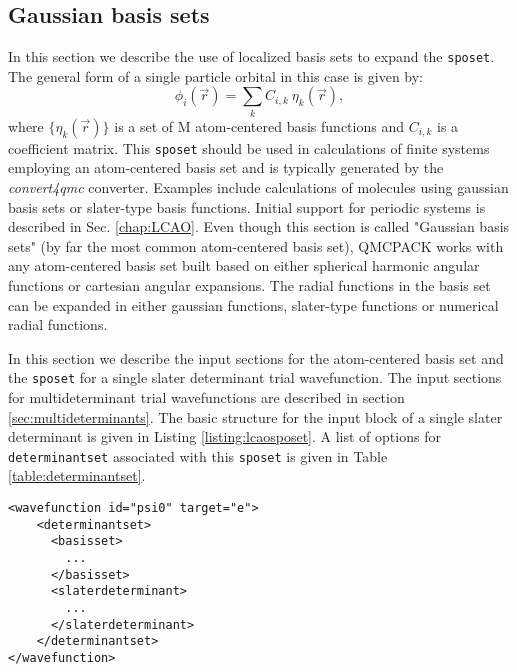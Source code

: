 \subsection{Gaussian basis sets}
\label{sec:gaussianbasis}

In this section we describe the use of localized basis sets to expand the \texttt{sposet}. The general form of a single particle orbital in this case is given by:
\begin{equation}
\phi_i(\vec{r}) = \sum_k C_{i,k} \ \eta_k(\vec{r}),
\end{equation}
where $\{\eta_k(\vec{r})\}$ is a set of M atom-centered basis
functions and $C_{i,k}$ is a coefficient matrix. This \texttt{sposet}
should be used in calculations of finite systems employing an
atom-centered basis set and is typically generated by the
\textit{convert4qmc} converter.  Examples include calculations of
molecules using gaussian basis sets or slater-type basis
functions. Initial support for periodic systems is described in Sec.
\ref{chap:LCAO}. Even though this section is called "Gaussian basis
sets" (by far the most common atom-centered basis set), QMCPACK works
with any atom-centered basis set built based on either spherical
harmonic angular functions or cartesian angular expansions. The radial
functions in the basis set can be expanded in either gaussian
functions, slater-type functions or numerical radial functions.

In this section we describe the input sections for the atom-centered basis set and the \texttt{sposet} for a single slater determinant trial wavefunction. The input sections for multideterminant trial wavefunctions are described in section \ref{sec:multideterminants}. The basic structure for the input block of a single slater determinant is given in Listing \ref{listing:lcaosposet}.
A list of options for \texttt{determinantset} associated with this \texttt{sposet} is given in Table \ref{table:determinantset}.

\begin{minipage}{\linewidth}
\begin{lstlisting}[style=XML,caption=Basic input block for a single determinant trial wavefunction using a sposet expanded on an atom-centered basis set. \label{listing:lcaosposet}]
<wavefunction id="psi0" target="e">
    <determinantset>
      <basisset>
        ...
      </basisset>
      <slaterdeterminant>
        ...
      </slaterdeterminant>
    </determinantset>    
</wavefunction>
\end{lstlisting}
\end{minipage}

